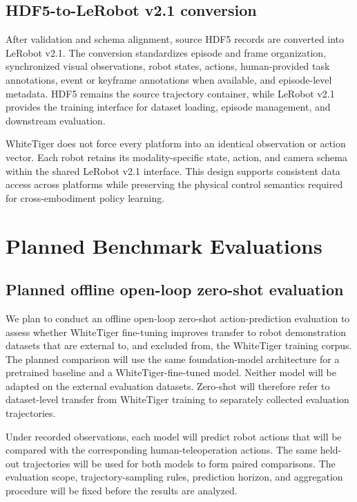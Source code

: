 \subsection{HDF5-to-LeRobot v2.1 conversion}

After validation and schema alignment, source HDF5 records are converted into LeRobot v2.1. The conversion standardizes episode and frame organization, synchronized visual observations, robot states, actions, human-provided task annotations, event or keyframe annotations when available, and episode-level metadata. HDF5 remains the source trajectory container, while LeRobot v2.1 provides the training interface for dataset loading, episode management, and downstream evaluation.

WhiteTiger does not force every platform into an identical observation or action vector. Each robot retains its modality-specific state, action, and camera schema within the shared LeRobot v2.1 interface. This design supports consistent data access across platforms while preserving the physical control semantics required for cross-embodiment policy learning.

\section{Planned Benchmark Evaluations}

\subsection{Planned offline open-loop zero-shot evaluation}

We plan to conduct an offline open-loop zero-shot action-prediction evaluation to assess whether WhiteTiger fine-tuning improves transfer to robot demonstration datasets that are external to, and excluded from, the WhiteTiger training corpus. The planned comparison will use the same foundation-model architecture for a pretrained baseline and a WhiteTiger-fine-tuned model. Neither model will be adapted on the external evaluation datasets. Zero-shot will therefore refer to dataset-level transfer from WhiteTiger training to separately collected evaluation trajectories.

Under recorded observations, each model will predict robot actions that will be compared with the corresponding human-teleoperation actions. The same held-out trajectories will be used for both models to form paired comparisons. The evaluation scope, trajectory-sampling rules, prediction horizon, and aggregation procedure will be fixed before the results are analyzed.

